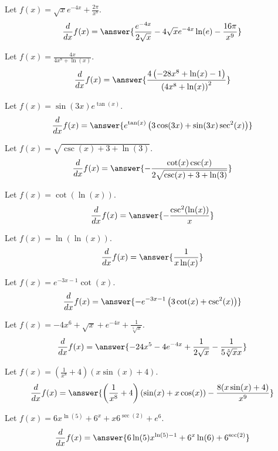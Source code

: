 \documentclass{ximera}
\begin{document}
\begin{shuffle}
\begin{exercise}
Let $f(x)=\sqrt{x} e^{-4 x}+\frac{2 \pi }{x^8}$.
\[
\ddx f(x) = \answer{\frac{e^{-4 x}}{2 \sqrt{x}}-4 \sqrt{x} e^{-4 x} \ln (e)-\frac{16 \pi }{x^9}}
\]
\end{exercise}

\begin{exercise}
Let $f(x)=\frac{4 x}{4 x^8+\ln (x)}$.
\[
\ddx f(x) = \answer{\frac{4 \left(-28 x^8+\ln (x)-1\right)}{\left(4 x^8+\ln (x)\right)^2}}
\]
\end{exercise}

\begin{exercise}
Let $f(x)=\sin (3 x) e^{\tan (x)}$.
\[
\ddx f(x) = \answer{e^{\tan (x)} \left(3 \cos (3 x)+\sin (3 x) \sec ^2(x)\right)}
\]
\end{exercise}

\begin{exercise}
Let $f(x)=\sqrt{\csc (x)+3+\ln (3)}$.
\[
\ddx f(x) = \answer{-\frac{\cot (x) \csc (x)}{2 \sqrt{\csc (x)+3+\ln (3)}}}
\]
\end{exercise}

\begin{exercise}
Let $f(x)=\cot (\ln (x))$.
\[
\ddx f(x) = \answer{-\frac{\csc ^2(\ln (x))}{x}}
\]
\end{exercise}

\begin{exercise}
Let $f(x)=\ln (\ln (x))$.
\[
\ddx f(x) = \answer{\frac{1}{x \ln (x)}}
\]
\end{exercise}

\begin{exercise}
Let $f(x)=e^{-3 x-1} \cot (x)$.
\[
\ddx f(x) = \answer{-e^{-3 x-1} \left(3 \cot (x)+\csc ^2(x)\right)}
\]
\end{exercise}

\begin{exercise}
Let $f(x)=-4 x^6+\sqrt{x}+e^{-4 x}+\frac{1}{\sqrt[5]{x}}$.
\[
\ddx f(x) = \answer{-24 x^5-4 e^{-4 x}+\frac{1}{2 \sqrt{x}}-\frac{1}{5 \sqrt[5]{x} x}}
\]
\end{exercise}

\begin{exercise}
Let $f(x)=\left(\frac{1}{x^8}+4\right) (x \sin (x)+4)$.
\[
\ddx f(x) = \answer{\left(\frac{1}{x^8}+4\right) (\sin (x)+x \cos (x))-\frac{8 (x \sin (x)+4)}{x^9}}
\]
\end{exercise}

\begin{exercise}
Let $f(x)=6 x^{\ln (5)}+6^x+x 6^{\sec (2)}+e^6$.
\[
\ddx f(x) = \answer{6 \ln (5) x^{\ln (5)-1}+6^x \ln (6)+6^{\sec (2)}}
\]
\end{exercise}


\end{shuffle}
\end{document}
